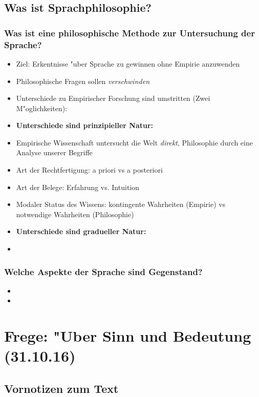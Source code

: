 \documentclass[]{scrartcl}
\begin{document}
\subsection{Was ist Sprachphilosophie?}
\subsubsection{Was ist eine philosophische Methode zur Untersuchung der Sprache?}
\begin{itemize}
  \item Ziel: Erkentnisse "uber Sprache zu gewinnen ohne Empirie anzuwenden
  \item Philosophische Fragen sollen \emph{verschwinden}
  \item Unterschiede zu Empirischer Forschung sind umstritten (Zwei M"oglichkeiten):
  \item \textbf{Unterschiede sind prinzipieller Natur:}
  \item Empirische Wissenschaft untersucht die Welt \emph{direkt}, Philosophie durch eine Analyse unserer Begriffe
  \item Art der Rechtfertigung: a priori vs a posteriori
  \item Art der Belege: Erfahrung vs. Intuition
  \item Modaler Status des Wissens: kontingente Wahrheiten (Empirie) vs notwendige Wahrheiten (Philosophie)
  \item \textbf{Unterschiede sind gradueller Natur:}
  \item 
\end{itemize}

\subsubsection{Welche Aspekte der Sprache sind Gegenstand?}

\begin{itemize}
  \item
  \item
\end{itemize}

\newpage



\section{Frege: "Uber Sinn und Bedeutung\\(31.10.16)}

\subsection{Vornotizen zum Text}
\end{document}
